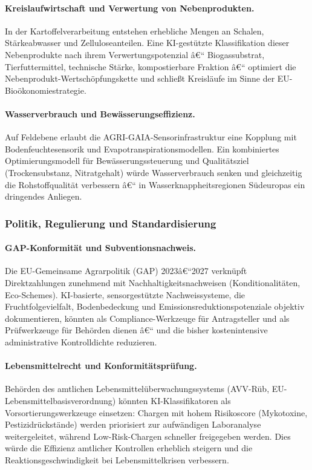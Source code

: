 ﻿\documentclass[12pt,a4paper]{article}
\theoremstyle{plain}
\theoremstyle{definition}
\begin{document}
	\paragraph{Kreislaufwirtschaft und Verwertung von Nebenprodukten.}
	In der Kartoffelverarbeitung entstehen erhebliche Mengen an Schalen,
	Stärkeabwasser und Zelluloseanteilen. Eine KI-gestützte Klassifikation
	dieser Nebenprodukte nach ihrem Verwertungspotenzial â€“ Biogassubstrat,
	Tierfuttermittel, technische Stärke, kompostierbare Fraktion â€“
	optimiert die Nebenprodukt-Wertschöpfungskette und schließt
	Kreisläufe im Sinne der EU-Bioökonomiestrategie.

	\paragraph{Wasserverbrauch und Bewässerungseffizienz.}
	Auf Feldebene erlaubt die AGRI-GAIA-Sensorinfrastruktur eine Kopplung
	mit Bodenfeuchtesensorik und Evapotranspira\-tions\-modellen. Ein
	kombiniertes Optimierungsmodell für Bewässerungssteuerung und
	Qualitätsziel (Trockensubstanz, Nitratgehalt) würde Wasserverbrauch
	senken und gleichzeitig die Rohstoffqualität verbessern â€“ in
	Wasserknappheitsregionen Südeuropas ein dringendes Anliegen.

	\subsubsection{Politik, Regulierung und Standardisierung}

	\paragraph{GAP-Konformität und Subventionsnachweis.}
	Die EU-Gemeinsame Agrarpolitik (GAP) 2023â€“2027 verknüpft Direktzahlungen
	zunehmend mit Nachhaltigkeitsnachweisen (Konditionali\-täten, Eco-Schemes).
	KI-basierte, sensorgestützte Nachweissysteme, die Fruchtfolgevielfalt,
	Bodenbedeckung und Emissionsreduktionspotenziale objektiv dokumentieren,
	könnten als Compliance-Werkzeuge für Antragsteller und als
	Prüfwerkzeuge für Behörden dienen â€“ und die bisher kostenintensive
	administrative Kontrolldichte reduzieren.

	\paragraph{Lebensmittelrecht und Konformitätsprüfung.}
	Behörden des amtlichen Lebensmittelüberwachungssystems (AVV-Rüb,
	EU-Lebensmittelbasisverordnung) könnten KI-Klassifikatoren als
	Vorsortierungswerkzeuge einsetzen: Chargen mit hohem Risikoscore
	(Mykotoxine, Pestizidrückstände) werden priorisiert zur aufwändigen
	Laboranalyse weitergeleitet, während Low-Risk-Chargen schneller
	freigegeben werden. Dies würde die Effizienz amtlicher Kontrollen
	erheblich steigern und die Reaktionsgeschwindigkeit bei
	Lebensmittelkrisen verbessern.
\end{document}
